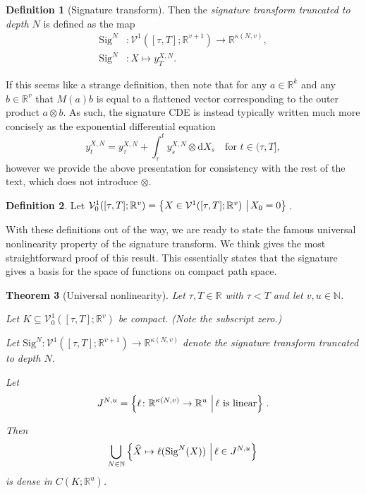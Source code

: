 \documentclass{article}
\theoremstyle{plain}
\newtheorem{thm}{Theorem}[section]
\theoremstyle{definition}
\newtheorem{definition}[thm]{Definition}
\newcommand{\reals}{\mathbb{R}}
\newcommand{\naturals}{\mathbb{N}}
\newcommand{\set}[2]{\left\{{#1}\,\left\vert\,{#2}\vphantom{{#1}}\right\}\right.}
\begin{document}
\begin{definition}[Signature transform]
	Then the \emph{signature transform truncated to depth $N$} is defined as the map
	\begin{align*}
	\mathrm{Sig}^N &\colon \mathcal{V}^1([\tau, T]; \reals^{v + 1}) \to \reals^{\kappa(N, v)},\\
	\mathrm{Sig}^N &\colon X \mapsto y^{X, N}_T.
	\end{align*}
	
	If this seems like a strange definition, then note that for any $a \in \reals^k$ and any $b \in \reals^v$ that $M(a)b$ is equal to a flattened vector corresponding to the outer product $a \otimes b$. As such, the signature CDE is instead typically written much more concisely as the exponential differential equation
	\begin{equation*}
	y^{X, N}_t = y^{X, N}_\tau + \int_\tau^t y^{X, N}_s \otimes \mathrm{d}X_s\quad\text{for $t \in (\tau, T]$},
	\end{equation*}
	however we provide the above presentation for consistency with the rest of the text, which does not introduce $\otimes$.\newline
	\end{definition}
	
	\begin{definition}
	Let $\mathcal{V}^1_0([\tau, T]; \reals^v) = \set{X \in \mathcal{V}^1([\tau, T]; \reals^v)}{X_0 = 0}$.
	\end{definition}

	With these definitions out of the way, we are ready to state the famous universal nonlinearity property of the signature transform. We think \cite[Theorem 4.2]{perezarribas2018} gives the most straightforward proof of this result. This essentially states that the signature gives a basis for the space of functions on compact path space.
	\begin{thm}[Universal nonlinearity]\label{thm:universal-nonlinearity}
	Let $\tau, T \in \reals$ with $\tau < T$ and let $v, u \in \naturals$. 
	
	Let $K \subseteq \mathcal{V}^1_0([\tau, T]; \reals^v)$ be compact. (Note the subscript zero.)
	
	Let $\mathrm{Sig}^N \colon \mathcal{V}^1([\tau, T]; \reals^{v + 1}) \to \reals^{\kappa(N, v)}$ denote the signature transform truncated to depth $N$.
	
	Let
	\begin{equation*}
	J^{N, u} = \set{\ell \colon \reals^{\kappa(N, v)} \to \reals^u}{\ell \text{ is linear}}.
	\end{equation*}
	
	Then
	\begin{equation*}
	\bigcup_{N \in \naturals} \set{\widehat{X} \mapsto \ell(\mathrm{Sig}^N(X))}{\ell \in J^{N, u}}
	\end{equation*}
	is dense in $C(K; \reals^u)$.
	\end{thm}
	
\end{document}
